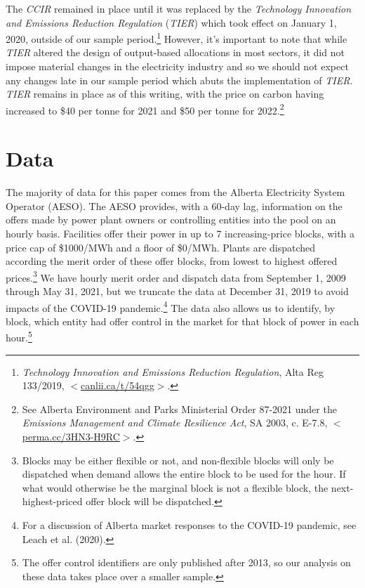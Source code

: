 \documentclass[12pt]{article}
\begin{document}
The \emph{CCIR} remained in place until it was replaced by the \emph{
Technology Innovation and Emissions Reduction Regulation} (\emph{TIER}) which took effect on January 1, 2020, outside of our sample period.\footnote{\textit{Technology Innovation and Emissions Reduction Regulation}, Alta Reg 133/2019, $<$\url{canlii.ca/t/54qgg}$>$.}  However, it's important to note that while \emph{TIER} altered the design of output-based allocations in most sectors, it did not impose material changes in the electricity industry and so we should not expect any changes late in our sample period which abuts the implementation of \emph{TIER}. \emph{TIER} remains in place as of this writing, with the price on carbon having increased to \$40 per tonne for 2021 and \$50 per tonne for 2022.\footnote{See Alberta Environment and Parks Ministerial Order 87-2021 under the \emph{Emissions Management and Climate Resilience Act}, SA 2003, c. E-7.8, $<$\url{perma.cc/3HN3-H9RC}$>$.}

\section{Data}

The majority of data for this paper comes from the Alberta Electricity System Operator (AESO). The AESO provides, with a 60-day lag, information on the offers made by power plant owners or controlling entities into the pool on an hourly basis. Facilities offer their power in up to 7 increasing-price blocks, with a price cap of \$1000/MWh and a floor of \$0/MWh. Plants are dispatched according the merit order of these offer blocks, from lowest to highest offered prices.\footnote{Blocks may be either flexible or not, and non-flexible blocks will only be dispatched when demand allows the entire block to be used for the hour. If what would otherwise be the marginal block is not a flexible block, the next-highest-priced offer block will be dispatched.} We have hourly merit order and dispatch data from September 1, 2009 through May 31, 2021, but we truncate the data at December 31, 2019 to avoid impacts of the COVID-19 pandemic.\footnote{For a discussion of Alberta market responses to the COVID-19 pandemic, see Leach et al. (2020).} The data also allows us to identify, by block, which entity had offer control in the market for that block of power in each hour.\footnote{The offer control identifiers are only published after 2013, so our analysis on these data takes place over a smaller sample.}
\end{document}
